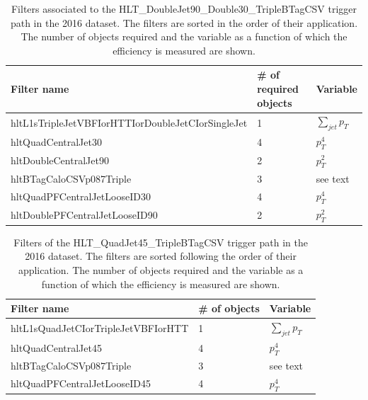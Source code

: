 \begin{table}[ht!]
\caption[Filters of the HLT\_DoubleJet90\_Double30\_TripleBTagCSV trigger path in the 2016 dataset]{\label{trigger:tab:filters2016Double}Filters associated to the HLT\_DoubleJet90\_Double30\_TripleBTagCSV trigger path in the 2016 dataset. The filters are sorted in the order of their application. The number of objects required and the variable as a function of which the efficiency is measured are shown.}
\centering
\begin{tabularx}{\textwidth}{lXX}
    \hline
    \small Filter name &\small \# of required objects    &\small Variable  \\
    \hline
    \small hltL1sTripleJetVBFIorHTTIorDoubleJetCIorSingleJet &\small 1 &\small $\sum_{jet} p_T$ \\
    \small hltQuadCentralJet30 &\small 4 &\small $p_T^4$ \\ 
    \small hltDoubleCentralJet90 &\small 2 &\small $p_T^2$ \\ 
    \small hltBTagCaloCSVp087Triple &\small 3 &\small see text \\ 
    \small hltQuadPFCentralJetLooseID30 &\small 4 &\small $p_T^4$ \\
    \small hltDoublePFCentralJetLooseID90 &\small 2 &\small $p_T^2$ \\
    \hline
\end{tabularx}
\end{table}

\begin{table}[ht!]
\caption[Filters of the HLT\_QuadJet45\_TripleBTagCSV trigger path in the 2016 dataset]{\label{trigger:tab:filters2016Quad}Filters of the HLT\_QuadJet45\_TripleBTagCSV trigger path in the 2016 dataset. The filters are sorted following the order of their application. The number of objects required and the variable as a function of which the efficiency is measured are shown.}
\centering
\begin{tabularx}{\textwidth}{lXX}
    \hline
    \small Filter name &\small \# of objects    &\small Variable  \\
    \hline
    \small hltL1sQuadJetCIorTripleJetVBFIorHTT &\small 1 &\small $\sum_{jet} p_T$ \\
    \small hltQuadCentralJet45 &\small 4 &\small $p_T^4$ \\ 
    \small hltBTagCaloCSVp087Triple &\small 3 &\small see text \\ 
    \small hltQuadPFCentralJetLooseID45 &\small 4 &\small $p_T^4$ \\
    \hline
\end{tabularx}
\end{table}

